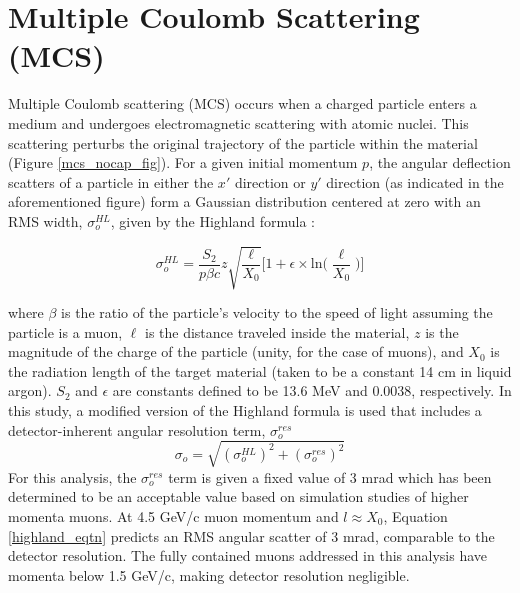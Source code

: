 \documentclass[a4paper,11pt]{article}
\begin{document}
\section{Multiple Coulomb Scattering (MCS)}

Multiple Coulomb scattering (MCS) occurs when a charged particle enters a medium and undergoes electromagnetic scattering with atomic nuclei. This scattering perturbs the original trajectory of the particle within the material (Figure \ref{mcs_nocap_fig}). For a given initial momentum $p$, the angular deflection scatters of a particle in either the $x'$ direction or $y'$ direction (as indicated in the aforementioned figure) form a Gaussian distribution centered at zero with an RMS width, $\sigma_o^{HL}$, given by the Highland formula \cite{highland}: 

\begin{equation}\label{highland_eqtn}
	\sigma_o^{HL}=\frac{S_2}{p\beta c}z\sqrt{\frac{\ell}{X_0}}\Big[1+\epsilon\times\text{ln}\Big(\frac{\ell}{X_0}\Big)\Big]
\end{equation}

\noindent where $\beta$ is the ratio of the particle's velocity to the speed of light assuming the particle is a muon, $\ell$ is the distance traveled inside the material, $z$ is the magnitude of the charge of the particle (unity, for the case of muons), and $X_0$ is the radiation length of the target material (taken to be a constant 14 cm in liquid argon). $S_2$ and $\epsilon$ are constants defined to be 13.6 MeV and 0.0038, respectively. In this study, a modified version of the Highland formula is used that includes a detector-inherent angular resolution term, $\sigma_o^{res}$
\begin{equation}\label{modified_highland_eqtn}
\sigma_{o} = \sqrt{ (\sigma_o^{HL})^2 + (\sigma_o^{res})^2}%
\end{equation}
For this analysis, the $\sigma_o^{res}$ term is given a fixed value of 3 mrad which has been determined to be an acceptable value based on simulation studies of higher momenta muons. At 4.5 GeV/c muon momentum and $l\approx X_0$, Equation \ref{highland_eqtn} predicts an RMS angular scatter of 3 mrad, comparable to the detector resolution. The fully contained muons addressed in this analysis have momenta below 1.5 GeV/c, making detector resolution negligible.\\
\end{document}
